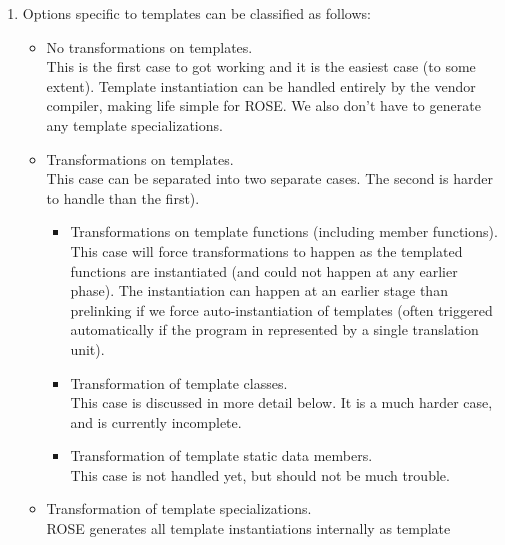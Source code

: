 \begin{enumerate}
     \item Options specific to templates can be classified as follows:
          \begin{itemize}
               \item No transformations on templates. \\
                     This is the first case to got working and it is the easiest case (to
                     some extent).  Template instantiation can be handled entirely by the
                     vendor compiler, making life simple for ROSE. We also don't have to
                     generate any template specializations.
               \item Transformations on templates. \\
                     This case can be separated into two separate cases. The second is harder
                     to handle than the first).
                    \begin{itemize}
                         \item Transformations on template functions (including member functions). \\
                               This case will force transformations to happen as the
                               templated functions are instantiated (and could not happen 
                               at any earlier phase).  The instantiation can happen
                               at an earlier stage than prelinking if we force
                               auto-instantiation of templates (often triggered
                               automatically if the program in represented by a single 
                               translation unit).
                         \item Transformation of template classes. \\
                               This case is discussed in more detail below. It is a much harder
                               case, and is currently incomplete.
                         \item Transformation of template static data members. \\
                               This case is not handled yet, but should not be much trouble.
                    \end{itemize}
               \item Transformation of template specializations. \\
                     ROSE generates all template instantiations internally as template

\end{itemize}
\end{enumerate}
